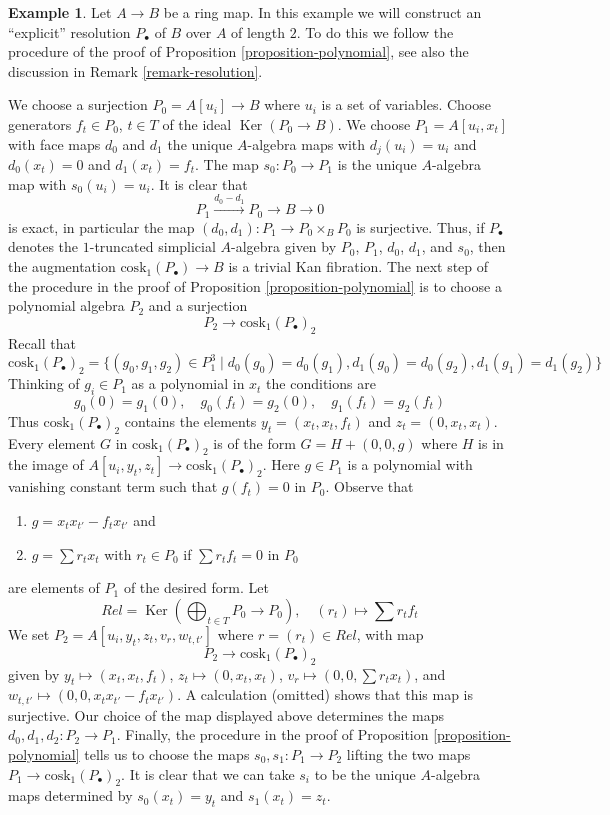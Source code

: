 \documentclass{stacks-project}
\theoremstyle{plain}
\theoremstyle{definition}
\newtheorem{example}[subsection]{Example}
\theoremstyle{remark}
\numberwithin{equation}{subsection}
\def\Ker{\mathop{\mathrm{Ker}}}
\begin{document}
\begin{example}
\label{example-resolution-length-two}
Let $A \to B$ be a ring map. In this example we 
will construct an ``explicit'' resolution $P_\bullet$ of $B$ over $A$ of
length $2$. To do this we follow the procedure of the proof of
Proposition \ref{proposition-polynomial}, see also the discussion in
Remark \ref{remark-resolution}.

\medskip\noindent
We choose a surjection $P_0 = A[u_i] \to B$ where $u_i$ is a set of
variables. Choose generators $f_t \in P_0$, $t \in T$ of the ideal
$\Ker(P_0 \to B)$. We choose $P_1 = A[u_i, x_t]$ with face maps
$d_0$ and $d_1$ the unique $A$-algebra maps with $d_j(u_i) = u_i$
and $d_0(x_t) = 0$ and $d_1(x_t) = f_t$. The map $s_0 : P_0 \to P_1$
is the unique $A$-algebra map with $s_0(u_i) = u_i$. It is clear that
$$
P_1 \xrightarrow{d_0 - d_1} P_0 \to B \to 0
$$
is exact, in particular the map $(d_0, d_1) : P_1 \to P_0 \times_B P_0$
is surjective. Thus, if $P_\bullet$ denotes the $1$-truncated
simplicial $A$-algebra given by $P_0$, $P_1$, $d_0$, $d_1$, and $s_0$, then
the augmentation $\text{cosk}_1(P_\bullet) \to B$ is a trivial Kan fibration.
The next step of the procedure in the proof of
Proposition \ref{proposition-polynomial}
is to choose a polynomial algebra $P_2$ and a surjection
$$
P_2 \longrightarrow \text{cosk}_1(P_\bullet)_2
$$
Recall that
$$
\text{cosk}_1(P_\bullet)_2 =
\{(g_0, g_1, g_2) \in P_1^3 \mid d_0(g_0) = d_0(g_1),
d_1(g_0) = d_0(g_2), d_1(g_1) = d_1(g_2)\}
$$
Thinking of $g_i \in P_1$ as a polynomial in $x_t$ the conditions
are
$$
g_0(0) = g_1(0),\quad
g_0(f_t) = g_2(0),\quad
g_1(f_t) = g_2(f_t)
$$
Thus $\text{cosk}_1(P_\bullet)_2$ contains the elements
$y_t = (x_t, x_t, f_t)$ and $z_t = (0, x_t, x_t)$.
Every element $G$ in $\text{cosk}_1(P_\bullet)_2$ is
of the form $G = H + (0, 0, g)$ where $H$ is in the image
of $A[u_i, y_t, z_t] \to \text{cosk}_1(P_\bullet)_2$. Here
$g \in P_1$ is a polynomial with vanishing
constant term such that $g(f_t) = 0$ in $P_0$. Observe that
\begin{enumerate}
\item $g = x_t x_{t'} - f_t x_{t'}$ and
\item $g = \sum r_t x_t$ with $r_t \in P_0$ if $\sum r_t f_t = 0$ in $P_0$
\end{enumerate}
are elements of $P_1$ of the desired form. Let
$$
Rel = \Ker(\bigoplus\nolimits_{t \in T} P_0 \longrightarrow P_0),\quad
(r_t) \longmapsto \sum r_tf_t
$$
We set $P_2 = A[u_i, y_t, z_t, v_r, w_{t, t'}]$ where
$r = (r_t) \in Rel$, with map
$$
P_2 \longrightarrow \text{cosk}_1(P_\bullet)_2
$$
given by $y_t  \mapsto (x_t, x_t, f_t)$,
$z_t \mapsto (0, x_t, x_t)$,
$v_r \mapsto (0, 0, \sum r_t x_t)$, and
$w_{t, t'} \mapsto (0, 0, x_t x_{t'} - f_t x_{t'})$. A calculation
(omitted) shows that this map is surjective. Our choice of the
map displayed above determines the maps $d_0, d_1, d_2 : P_2 \to P_1$.
Finally, the procedure in the proof of
Proposition \ref{proposition-polynomial}
tells us to choose the maps $s_0, s_1 : P_1 \to P_2$ lifting the two
maps $P_1 \to \text{cosk}_1(P_\bullet)_2$. It is clear that we can take
$s_i$ to be the unique $A$-algebra maps determined by
$s_0(x_t) = y_t$ and $s_1(x_t) = z_t$.
\end{example}
\end{document}
